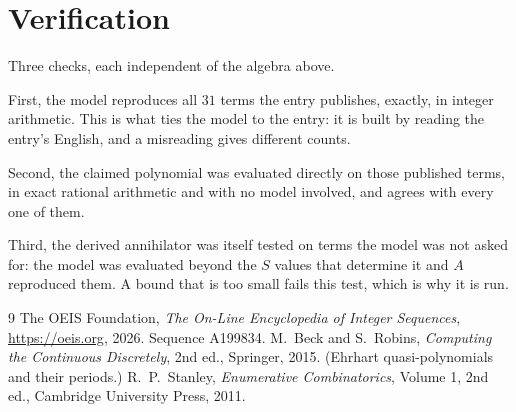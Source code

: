 \documentclass[11pt,a4paper]{article}
\theoremstyle{plain}
\theoremstyle{definition}
\begin{document}
\section{Verification}

Three checks, each independent of the algebra above.

First, the model reproduces all $31$ terms the entry publishes, exactly, in integer
arithmetic. This is what ties the model to the entry: it is built by reading the entry's
English, and a misreading gives different counts.

Second, the claimed polynomial was evaluated directly on those published terms, in exact
rational arithmetic and with no model involved, and agrees with every one of them.

Third, the derived annihilator was itself tested on terms the model was not asked for: the
model was evaluated beyond the $S$ values that determine it and $A$ reproduced them. A bound
that is too small fails this test, which is why it is run.

\begin{thebibliography}{9}
 The OEIS Foundation, \emph{The On-Line Encyclopedia of Integer
Sequences}, \url{https://oeis.org}, 2026. Sequence A199834.
 M.~Beck and S.~Robins, \emph{Computing the Continuous Discretely},
2nd ed., Springer, 2015. (Ehrhart quasi-polynomials and their periods.)
 R.~P.~Stanley, \emph{Enumerative Combinatorics}, Volume 1, 2nd ed.,
Cambridge University Press, 2011.
\end{thebibliography}
\end{document}
